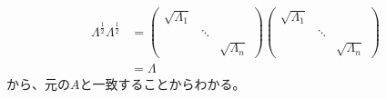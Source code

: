 \begin{align*}
  \Lambda^{\frac{1}{2}} \Lambda^{\frac{1}{2}} & = \left(
                                                    \begin{array}{ccc}
                                                      \sqrt{\Lambda_1} &        & \\
                                                                       & \ddots & \\
                                                                       &        & \sqrt{\Lambda_n}
                                                    \end{array}
                                                  \right)
                                                  \left(
                                                    \begin{array}{ccc}
                                                      \sqrt{\Lambda_1} &        & \\
                                                                       & \ddots & \\
                                                                       &        & \sqrt{\Lambda_n}
                                                    \end{array}
                                                  \right) \\
                                              & = \Lambda
\end{align*}
から、元の$A$と一致することからわかる。

